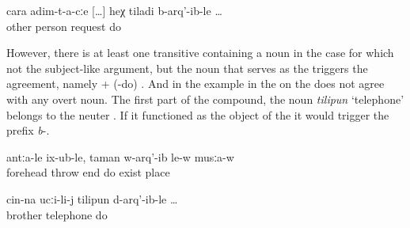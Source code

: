 %
\begin{exe}
	\ex	\label{ex:when we asked other people}
	\gll	cara	adim-t-a-cːe	[\ldots]	heχ	tiladi	b-arq'-ib-le	\ldots\\
		other	person	{} 		request	do\\
	\glt	{}
\end{exe}

However, there is at least one transitive  containing a noun in the  case for which not the subject-like argument, but the noun that serves as the  triggers the  agreement, namely   +  (-do)  . And in the example in  the  on the  does not agree with any overt noun. The first part of the compound, the noun \textit{tilipun} `telephone' belongs to the neuter . If it functioned as the object of the  it would trigger the prefix \textit{b}-.
%
\begin{exe}
	\ex	\label{ex:(They) shot him into the forehead}
	\gll	antːa-le	ix-ub-le,	taman	w-arq'-ib	le-w	musːa-w\\
		forehead	throw	end	do	exist	place\\
	\glt	{}

	\ex	\label{ex:when (they) called the brother on the phone}
	\gll	cin-na	ucːi-li-j	tilipun	d-arq'-ib-le	\ldots\\
			brother	telephone	do\\
	\glt	{}
\end{exe}

